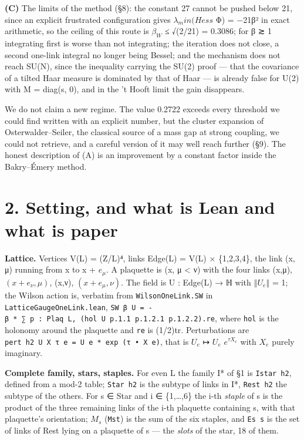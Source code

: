 \documentclass[11pt,a4paper]{article}
\theoremstyle{named}
\begin{document}
\textbf{(C)} The limits of the method (§8): the constant 27 cannot be pushed below 21, since an explicit frustrated configuration gives $λ_min(Hess$ Φ) = −21β² in exact arithmetic, so the ceiling of this route is $β_W$ ≤ √(2/21) = 0.3086; for β ≳ 1 integrating first is worse than not integrating; the iteration does not close, a second one-link integral no longer being Bessel; and the mechanism does not reach SU(N), since the inequality carrying the SU(2) proof — that the covariance of a tilted Haar measure is dominated by that of Haar — is already false for U(2) with M = diag(s, 0), and in the 't Hooft limit the gain disappears.

We do not claim a new regime. The value 0.2722 exceeds every threshold we could find written with an explicit number, but the cluster expansion of Osterwalder–Seiler, the classical source of a mass gap at strong coupling, we could not retrieve, and a careful version of it may well reach further (§9). The honest description of (A) is an improvement by a constant factor inside the Bakry–Émery method.

\section*{2. Setting, and what is Lean and what is paper}
\textbf{Lattice.} Vertices V(L) = (Z/L)⁴, links Edge(L) = V(L) × \{1,2,3,4\}, the link (x, μ) running from x to x + $e_{μ}$. A plaquette is (x, μ \textless{} ν) with the four links (x,μ), $(x+e_{ν},μ)$, (x,ν), $(x+e_{μ},ν)$. The field is U : Edge(L) → ℍ with $‖U_e‖$ = 1; the Wilson action is, verbatim from \texttt{WilsonOneLink.\allowbreak{}SW} in \texttt{LatticeGaugeOneLink.\allowbreak{}lean}, \texttt{SW\ \allowbreak{}β\ \allowbreak{}U\ \allowbreak{}=\ \allowbreak{}-β\ \allowbreak{}*\ \allowbreak{}∑\ \allowbreak{}p\ \allowbreak{}:\ \allowbreak{}Plaq\ \allowbreak{}L,\ \allowbreak{}(hol\ \allowbreak{}U\ \allowbreak{}p.\allowbreak{}1.\allowbreak{}1\ \allowbreak{}p.\allowbreak{}1.\allowbreak{}2.\allowbreak{}1\ \allowbreak{}p.\allowbreak{}1.\allowbreak{}2.\allowbreak{}2).\allowbreak{}re}, where \texttt{hol} is the holonomy around the plaquette and \texttt{re} is (1/2)tr. Perturbations are \texttt{pert\ \allowbreak{}h2\ \allowbreak{}U\ \allowbreak{}X\ \allowbreak{}τ\ \allowbreak{}e\ \allowbreak{}=\ \allowbreak{}U\ \allowbreak{}e\ \allowbreak{}*\ \allowbreak{}exp\ \allowbreak{}(τ\ \allowbreak{}•\ \allowbreak{}X\ \allowbreak{}e)}, that is $U_e$ ↦ $U_e$ $e^{τX_e}$ with $X_e$ purely imaginary.

\textbf{Complete family, stars, staples.} For even L the family I* of §1 is \texttt{Istar\ \allowbreak{}h2}, defined from a mod-2 table; \texttt{Star\ \allowbreak{}h2} is the subtype of links in I*, \texttt{Rest\ \allowbreak{}h2} the subtype of the others. For s ∈ Star and i ∈ \{1,…,6\} the i-th \textit{staple} of s is the product of the three remaining links of the i-th plaquette containing s, with that plaquette's orientation; $M_s$ (\texttt{Mst}) is the sum of the six staples, and \texttt{Es\ \allowbreak{}s} is the set of links of Rest lying on a plaquette of s — the \textit{slots} of the star, 18 of them.
\end{document}
